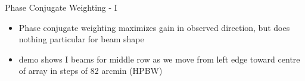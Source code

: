 \documentclass[pdf,azure,slideColor,colorBG]{prosper}
\begin{document}

\begin{slide}{Phase Conjugate Weighting - I}
\begin{small}
\begin{itemize}
\item Phase conjugate weighting maximizes gain in observed
direction, but does nothing particular for beam shape
\item demo shows I beams for middle row as we move from left edge toward centre of array in steps of 82 arcmin (HPBW)
\end{itemize}
\end {small}
{\centering
{}
}
\end{slide}
\end{document}

